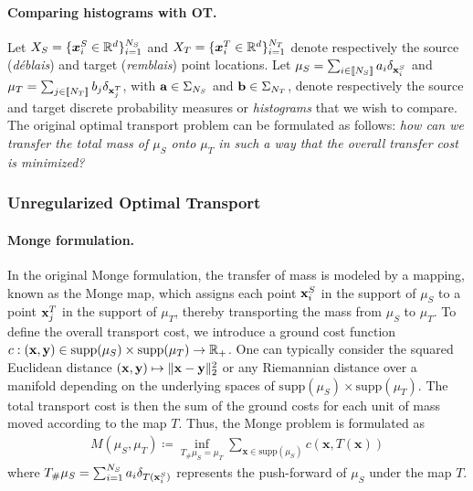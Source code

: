 \paragraph{Comparing histograms with OT.}
Let $X_S = \{ \bm{x}_i^S \in \mathbb{R}^d \}_{i=1}^{N_S}$ and $X_T = \{ \bm{x}_i^T \in \mathbb{R}^d \}_{i=1}^{N_T}$ denote respectively the source (\emph{déblais}) and target (\emph{remblais}) point locations. Let  \(\mu_S = \sum_{i \in {[\![N_S]\!]}} a_i \delta_{{\mathbf{x}}^S_i}\) and \(\mu_T = \sum_{j \in {[\![N_T]\!]}} b_j \delta_{{\mathbf{x}}^T_j}\), with ${\mathbf{a}} \in \Sigma_{N_S}$ and ${\mathbf{b}} \in \Sigma_{N_T}$, denote respectively the source and target discrete probability measures or \emph{histograms} that we wish to compare. The original optimal transport problem can be formulated as follows: \emph{how can we transfer the total mass of \(\mu_S\) onto \(\mu_T\) in such a way that the overall transfer cost is minimized?}

\subsubsection{Unregularized Optimal Transport}

\paragraph{Monge formulation.}
In the original Monge formulation, the transfer of mass is modeled by a mapping, known as the Monge map, which assigns each point \({\mathbf{x}}^S_i\) in the support of \(\mu_S\) to a point \({\mathbf{x}}^T_j\) in the support of \(\mu_T\), thereby transporting the mass from \(\mu_S\) to \(\mu_T\). To define the overall transport cost, we introduce a ground cost function \(c: ({\mathbf{x}}, {\mathbf{y}}) \in \text{supp}(\mu_S) \times \text{supp}(\mu_T) \to \mathbb{R}_+\). One can typically consider the squared Euclidean distance $({\mathbf{x}}, {\mathbf{y}}) \mapsto \| {\mathbf{x}} - {\mathbf{y}} \|_2^2$ or any Riemannian distance over a manifold \citep{villani2009optimal} depending on the underlying spaces of $\text{supp}(\mu_S) \times \text{supp}(\mu_T)$. The total transport cost is then the sum of the ground costs for each unit of mass moved according to the map \(T\). Thus, the Monge problem is formulated as
\begin{align}
    \label{eq:monge_pb}
    \tag{Monge}
    M(\mu_S, \mu_T) \coloneqq \inf_{T_{\#}\mu_S = \mu_T} \sum_{\bm{x} \in \text{supp}(\mu_S)} c(\bm{x}, T(\bm{x}))
\end{align}
where \(T_{\#}\mu_S = \sum_{i=1}^{N_S} a_i \delta_{T({\mathbf{x}}_i^S)}\) represents the push-forward of \(\mu_S\) under the map \(T\).

